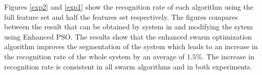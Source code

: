 \documentclass[10pt]{article}
\begin{document}
Figures \ref{exp2} and \ref{exp1} show the recognition rate of each algorithm using the full feature set and half the features set respectively. The figures compares between the result that can be obtained by system in \cite{mypaper} and modifying the sytem using Enhanced PSO. The results show that the enhanced swarm optimization algorithm improves the segmentation of the system which leads to an increase in the recognition rate of the whole system by an average of $1.5\%$.  The increase in recognition rate is consistent in all swarm algorithms and in both experiments.   %
	 

 
\end{document}
